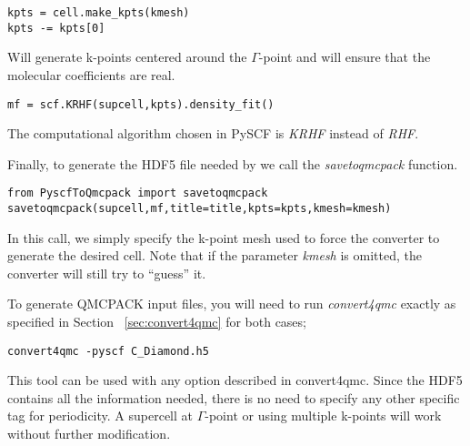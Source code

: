 \begin{lstlisting}
kpts = cell.make_kpts(kmesh)
kpts -= kpts[0]
\end{lstlisting}
Will generate k-points centered around the $\Gamma$-point and will ensure that the molecular coefficients are real.\\

\begin{lstlisting}[style=Python]
mf = scf.KRHF(supcell,kpts).density_fit()
\end{lstlisting}
The computational algorithm chosen in PySCF is \textit{KRHF} instead of \textit{RHF}.

Finally, to generate the HDF5 file needed by \qmcpack we call the \textit{savetoqmcpack} function.\\
\begin{lstlisting}[style=Python]
from PyscfToQmcpack import savetoqmcpack
savetoqmcpack(supcell,mf,title=title,kpts=kpts,kmesh=kmesh)
\end{lstlisting}
In this call, we simply specify the k-point mesh used to force the converter to generate the desired cell. Note that if the parameter \textit{kmesh} is omitted, the converter will still try to ``guess'' it.



To generate QMCPACK input files, you will need to run  \textit{convert4qmc} exactly as specified in Section ~\ref{sec:convert4qmc} for both cases;
\begin{lstlisting}[style=SHELL]
convert4qmc -pyscf C_Diamond.h5
\end{lstlisting}

This tool can be used with any option described in convert4qmc. Since
the HDF5 contains all the information needed, there is no need to
specify any other specific tag for periodicity. A supercell at
$\Gamma$-point or using multiple k-points will work without further
modification.

